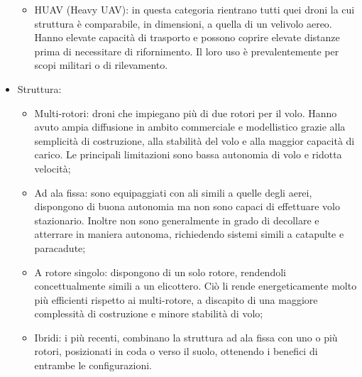 \begin{itemize}
\begin{itemize}
			\item HUAV (Heavy UAV):  in questa categoria rientrano tutti quei droni la cui struttura è comparabile, in dimensioni, a quella di un velivolo aereo. Hanno elevate capacità di trasporto e possono coprire elevate distanze prima di necessitare di rifornimento. Il loro uso è prevalentemente per scopi militari o di rilevamento.
		\end{itemize}
	\item Struttura:
		\begin{itemize}
			\item Multi-rotori: droni che impiegano più di due rotori per il volo. Hanno avuto ampia diffusione in ambito commerciale e modellistico grazie alla semplicità di costruzione, alla stabilità del volo e alla maggior capacità di carico. Le principali limitazioni sono bassa autonomia di volo e ridotta velocità;
			\item Ad ala fissa: sono equipaggiati con ali simili a quelle degli aerei, dispongono di buona autonomia ma non sono capaci di effettuare volo stazionario. Inoltre non sono generalmente in grado di decollare e atterrare in maniera autonoma, richiedendo sistemi simili a catapulte e paracadute;
			\item A rotore singolo: dispongono di un solo rotore, rendendoli concettualmente simili a un elicottero. Ciò li rende energeticamente molto più efficienti rispetto ai multi-rotore, a discapito di una maggiore complessità di costruzione e minore stabilità di volo;
			\item Ibridi: i più recenti, combinano la struttura ad ala fissa con uno o più rotori, posizionati in coda o verso il suolo, ottenendo i benefici di entrambe le configurazioni. 
		\end{itemize}
\end{itemize}

